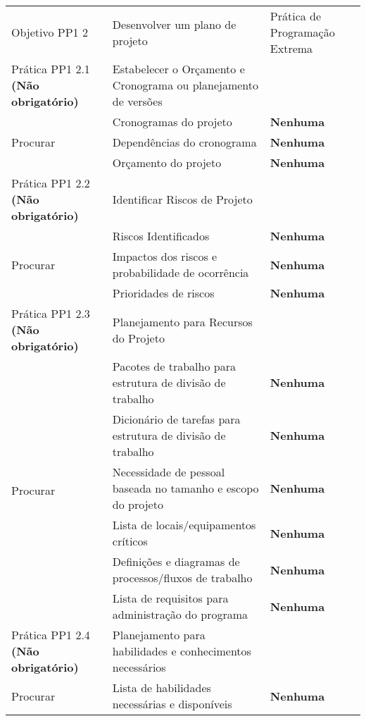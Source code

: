 \begin{longtable}{|p{2cm}|p{7cm}|p{7cm}|}
  \hline
  & & \\
  \hline \cellcolor[gray]{0.6} Objetivo PP1 2 & \cellcolor[gray]{0.6}
  Desenvolver um plano de projeto & Prática de Programação Extrema \\
  \hline \cellcolor[gray]{0.9} Prática PP1 2.1 \textbf{(Não
    obrigatório)} & \cellcolor[gray]{0.9} Estabelecer o Orçamento e
  Cronograma ou
  planejamento de versões & \\
  \hline \multirow{3}{*}{Procurar} & Cronogramas do projeto &
  \textbf{Nenhuma} \\
  \cline{2-3} & Dependências do cronograma &\textbf{Nenhuma} \\
  \cline{2-3} & Orçamento do projeto &\textbf{Nenhuma} \\
  \hline \cellcolor[gray]{0.9} Prática PP1 2.2 \textbf{(Não
    obrigatório)} &
  \cellcolor[gray]{0.9} Identificar Riscos de Projeto & \\
  \hline \multirow{3}{*}{Procurar} & Riscos Identificados &
  \textbf{Nenhuma} \\
  \cline{2-3} & Impactos dos riscos e probabilidade de ocorrência &\textbf{Nenhuma} \\
  \cline{2-3} & Prioridades de riscos &\textbf{Nenhuma} \\
  \hline \cellcolor[gray]{0.9} Prática PP1 2.3 \textbf{(Não
    obrigatório)} &
  \cellcolor[gray]{0.9} Planejamento para Recursos do Projeto & \\
  \hline \multirow{6}{*}{Procurar} & Pacotes de trabalho para
  estrutura de divisão de trabalho & \textbf{Nenhuma} \\
  \cline{2-3} & Dicionário de tarefas para
  estrutura de divisão de trabalho &\textbf{Nenhuma} \\
  \cline{2-3} & Necessidade de pessoal baseada no tamanho e escopo do
  projeto &\textbf{Nenhuma} \\
  \cline{2-3} & Lista de locais/equipamentos críticos &\textbf{Nenhuma} \\
  \cline{2-3} & Definições e diagramas de processos/fluxos de trabalho
  &\textbf{Nenhuma} \\
  \cline{2-3} & Lista de requisitos para administração do programa
  &\textbf{Nenhuma} \\
  \hline \cellcolor[gray]{0.9} Prática PP1 2.4 \textbf{(Não
    obrigatório)} &
  \cellcolor[gray]{0.9} Planejamento para habilidades e conhecimentos necessários & \\
  \hline \multirow{3}{*}{Procurar} & Lista de habilidades necessárias
  e disponíveis & \textbf{Nenhuma} \\

\end{longtable}
